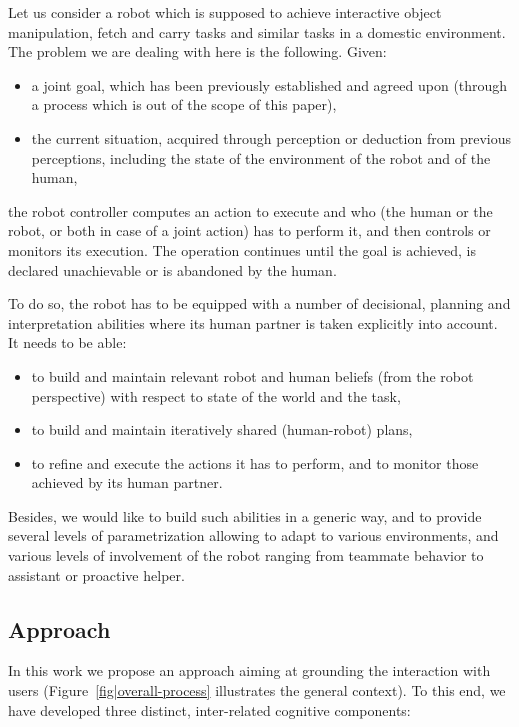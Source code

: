 \documentclass{svmult}
\begin{document}
Let us consider a robot which is supposed to achieve interactive
object manipulation, fetch and carry tasks and similar tasks in a
domestic environment. The problem we are dealing with here is the
following. Given:
\begin {itemize}
\item a joint goal, which has been previously established and agreed
  upon (through a process which is out of the scope of this paper),
\item the current situation, acquired through perception or
  deduction from previous perceptions, including the state of the
  environment of the robot and of the human,
\end {itemize}
the robot controller computes an action to execute and who (the 
human or the robot, or both in case of a joint action) has to perform
it, and then controls or monitors its execution. The operation
continues until the goal is achieved, is declared unachievable or is
abandoned by the human.

To do so, the robot has to be equipped with a number of decisional, planning
and interpretation abilities where its human partner is taken
explicitly into account. It needs to be able:
\begin {itemize}
\item to build and maintain relevant robot and human beliefs
  (from the robot perspective) with respect to state of the world and the task,
\item to build and maintain iteratively shared (human-robot) plans, 
\item to refine and execute the actions it has to perform, and to monitor 
those achieved by its human partner.
\end {itemize}

Besides, we would like to build such abilities in a generic way, and
to provide several levels of parametrization allowing to adapt to
various environments, and various levels of involvement of the robot
ranging from teammate behavior to assistant or proactive helper.

\subsection{Approach}

In this work we propose an approach aiming at grounding the interaction with
users (Figure~\ref{fig|overall-process} illustrates the general context). To this end, we have
developed three distinct, inter-related cognitive components:
\end{document}
